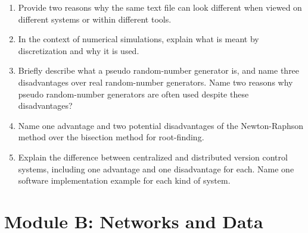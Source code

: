 \documentclass[oneside]{article}
\newcommand{\answerspace}{\vskip 6.5cm}
\newcommand{\answer}[1]{}
\begin{document}
 \begin{enumerate}
  \item Provide two reasons why the same text file can look different when viewed on different systems or within different tools. \answer{EOL, TABS,
        Syntax highlighting, Character encodings}
\answerspace
  \item In the context of numerical simulations, explain what is meant by discretization and why it is used.\answer{model of continuous function
        on discrete set; because continuous space would require unlimited
        memory}
\answerspace
  \item Briefly describe what a pseudo random-number generator is, and name three
        disadvantages over real random-number generators. Name two reasons why pseudo random-number generators are
        often used despite these disadvantages?
        \answer{generate sequences of numbers with properties close to real
        random numbers; finite size sequences, correlations, non-uniform distribution;
        cheap, fast, reproducible}
\answerspace
  \item Name one advantage and two potential disadvantages of the Newton-Raphson method over the bisection method for root-finding.
        \answer{The advantage is that it's convergence is 2nd order, while bisection is only 1st order, disadvantages are that the first derivative is needed and that NR can fail quite often while bisection is 'robust'}
\answerspace
  \item 
  Explain the difference between centralized and distributed version control systems, including
  one advantage and one disadvantage for each. Name one software implementation example for
  each kind of system.
  \answer{central: shallower learning curve <-> most operations require network (cvs,svn)
          decentral: steeper learning curve <-> most operations local (git,darcs,mercurial)}
 \end{enumerate}

\newpage

\section*{\center Module B: Networks and Data}
\end{document}
